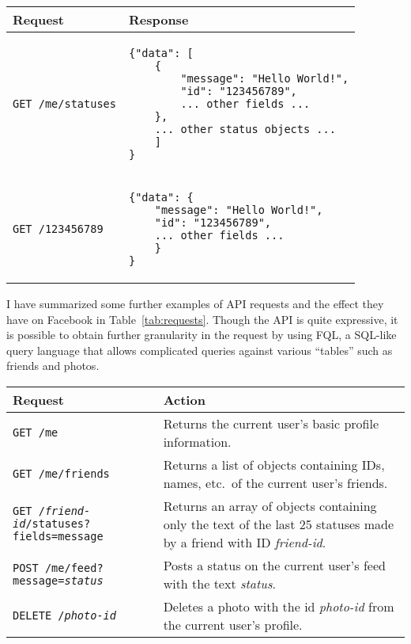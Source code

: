 \documentclass[11pt,twocolumn]{article}
\begin{document}
\begin{table*}[h]
\caption{Sample Graph API Requests}
\centering
\begin{tabular}{ll}\toprule
    Request & Response \\\midrule
    \texttt{GET /me/statuses} &
\begin{minipage}{3in}
\begin{verbatim}
{"data": [
    {
        "message": "Hello World!",
        "id": "123456789",
        ... other fields ...
    },
    ... other status objects ...
    ]
}
\end{verbatim}
\end{minipage} \\\midrule
\texttt{GET /123456789} &
\begin{minipage}{3in}
\begin{verbatim}
{"data": {
    "message": "Hello World!",
    "id": "123456789",
    ... other fields ...
    }
}
\end{verbatim}
\end{minipage} \\\bottomrule
\end{tabular}
\label{tab:request-response}
\end{table*}

I have summarized some further examples of API requests and the effect they
have on Facebook in Table~\ref{tab:requests}. Though the API is quite
expressive, it is possible to obtain further granularity in the request by
using FQL, a SQL-like query language that allows complicated queries against
various ``tables'' such as friends and photos.

\begin{table*}[h]
\centering
\caption{Graph API Examples}
\begin{tabular}{lp{7cm}} \toprule
Request & Action \\\midrule
\texttt{GET /me} &
Returns the current user's basic profile information. \\

\texttt{GET /me/friends} &
Returns a list of objects containing IDs, names, etc.\ of the current user's
friends. \\

\texttt{GET /\textit{friend-id}/statuses?fields=message} &
Returns an array of objects containing only the text of the last 25 statuses
made by a friend with ID \textit{friend-id}. \\

\texttt{POST /me/feed?message=\textit{status}} &
Posts a status on the current user's feed with the text \textit{status}. \\

\texttt{DELETE /\textit{photo-id}} &
Deletes a photo with the id \textit{photo-id} from the current user's profile.
\\\bottomrule
\end{tabular}
\label{tab:requests}
\end{table*}
\end{document}
